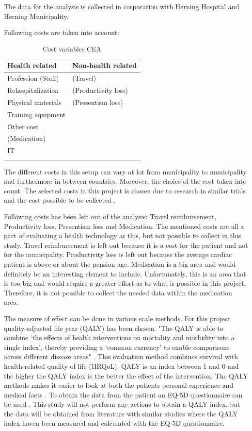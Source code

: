The data for the analysis is collected in corporation with Herning Hospital and Herning Municipality. 

Following costs are taken into account:


\begin{longtabu} to 
	\textbf{Health related} & \textbf{Non-health related}\\[-1ex]
	\midrule
	Profession (Staff) & (Travel) \\[-1ex]
	Rehospitalization & (Productivity loss) \\[-1ex]
	Physical materials & (Presentism loss)\\[-1ex]
	Training equipment &  \\[-1ex]
	Other cost &  \\[-1ex]
	(Medication) &  \\[-1ex]
	IT &  \\[-1ex]
	\hline
	\caption{Cost variables CEA}
\end{longtabu}

The different costs in this setup can vary at lot from municipality to municipality and furthermore in between countries. Moreover, the choice of the cost taken into count. The selected costs in this project is chosen due to research in similar trials and the cost possible to be collected \cite{costeffect, usingeffect}. 

Following costs has been left out of the analysis: Travel reimbursement, Productivity loss, Presentism loss and Medication. The mentioned costs are all a part of evaluating a health technology as this, but not possible to collect in this study. Travel reimbursement is left out because it is a cost for the patient and not for the municipality. Productivity loss is left out because the average cardiac patient is above or about the pension age. Medication is a big area and would definitely be an interesting element to include. Unfortunately, this is an area that is too big and would require a greater effort as to what is possible in this project. Therefore, it is not possible to collect the needed data within the medication area. 

The measure of effect can be done in various scale methods. For this project quality-adjusted life year (QALY) has been chosen. "The QALY is able to combine ‘the effects of health interventions on mortality and morbidity into a single index’, thereby providing a ‘common currency’ to enable comparisons across different disease areas" \cite{QALY}. This evaluation method combines survival with health-related quality of life (HRQoL). QALY is an index between 1 and 0 and the higher the QALY index is the better the effect of the intervention. The QALY methods makes it easier to look at both the patients personal experience and medical facts \cite{QALY}. To obtain the data from the patient an EQ-5D questionnaire can be used \cite{costeffect}. This study will not perform any actions to obtain a QALY index, but the data will be obtained from literature with similar studies where the QALY index haven been measured and calculated with the EQ-5D questionnaire.



